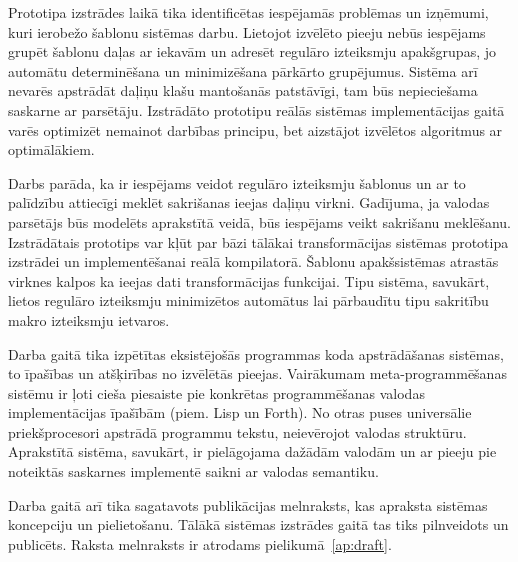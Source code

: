 Prototipa izstrādes laikā tika identificētas iespējamās problēmas un izņēmumi, kuri ierobežo šablonu sistēmas darbu. Lietojot izvēlēto pieeju nebūs iespējams grupēt šablonu daļas ar iekavām un adresēt regulāro izteiksmju apakšgrupas, jo automātu determinēšana un minimizēšana pārkārto grupējumus. Sistēma arī nevarēs apstrādāt daļiņu klašu mantošanās patstāvīgi, tam būs nepieciešama saskarne ar parsētāju. Izstrādāto prototipu reālās sistēmas implementācijas gaitā varēs optimizēt nemainot darbības principu, bet aizstājot izvēlētos algoritmus ar optimālākiem.

Darbs parāda, ka ir iespējams veidot regulāro izteiksmju šablonus un ar to palīdzību attiecīgi meklēt sakrišanas ieejas daļiņu virkni. Gadījuma, ja valodas parsētājs būs modelēts aprakstītā veidā, būs iespējams veikt sakrišanu meklēšanu. Izstrādātais prototips var kļūt par bāzi tālākai transformācijas sistēmas prototipa izstrādei un implementēšanai reālā kompilatorā. Šablonu apakšsistēmas atrastās virknes kalpos ka ieejas dati transformācijas funkcijai. Tipu sistēma, savukārt, lietos regulāro izteiksmju minimizētos automātus lai pārbaudītu tipu sakritību makro izteiksmju ietvaros.

Darba gaitā tika izpētītas eksistējošās programmas koda apstrādāšanas sistēmas, to īpašības un atšķirības no izvēlētās pieejas. Vairākumam meta-programmēšanas sistēmu ir ļoti cieša piesaiste pie konkrētas programmēšanas valodas implementācijas īpašībām (piem. Lisp un Forth). No otras puses universālie priekšprocesori apstrādā programmu tekstu, neievērojot valodas struktūru. Aprakstītā sistēma, savukārt, ir pielāgojama dažādām valodām un ar pieeju pie noteiktās saskarnes implementē saikni ar valodas semantiku.

Darba gaitā arī tika sagatavots publikācijas melnraksts, kas apraksta sistēmas koncepciju un pielietošanu. Tālākā sistēmas izstrādes gaitā tas tiks pilnveidots un publicēts. Raksta melnraksts ir atrodams pielikumā~\ref{ap:draft}.